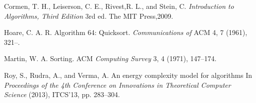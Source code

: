 \documentclass[a4paper, 10pt,twocolumn]{article}
\begin{document}
\begin{thebibliography}{25}
Cormen, T. H., Leiserson, C. E., Rivest,R. L., and Stein, C. \textit{Introduction to Algorithms, Third Edition}
3rd ed. The MIT Press,2009.

Hoare, C. A. R. Algorithm 64: Quicksort. \textit{Communications of} ACM 4, 7 (1961), 321–.

Martin, W. A. Sorting. ACM \textit{Computing Survey} 3, 4 (1971), 147–174.

Roy, S., Rudra, A., and Verma, A. An energy
complexity model for algorithms
In \textit{Proceedings of the 4th Conference on Innovations in Theoretical Computer Science}
(2013), ITCS'13, pp. 283–304.
\end{thebibliography}
\end{document}
